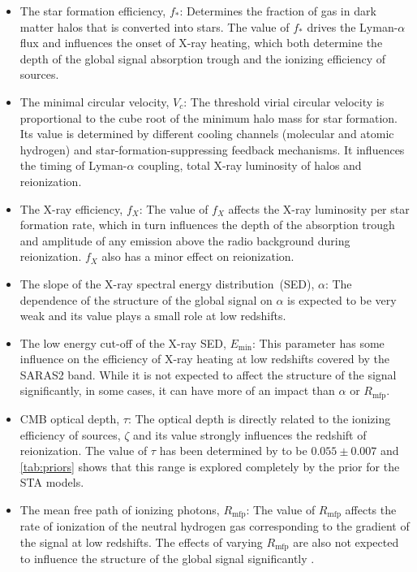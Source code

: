 \begin{itemize}
    \item The star formation efficiency, $f_*$: Determines the fraction of gas in dark matter halos that is converted into stars. The value of $f_*$ drives the Lyman-$\alpha$ flux and influences the onset of X-ray heating, which both determine the depth of the global signal absorption trough and the ionizing efficiency of sources.
    \item The minimal circular velocity, $V_c$: The threshold virial circular velocity is proportional to the cube root of the minimum halo mass for star formation. Its value is determined by different
    cooling channels (molecular and atomic hydrogen) and star-formation-suppressing feedback mechanisms. It influences the timing of Lyman-$\alpha$ coupling, total X-ray luminosity of halos and reionization.
    \item The X-ray efficiency, $f_X$: The value of $f_X$ affects the X-ray luminosity per star formation rate, which in turn influences the depth of the absorption trough and amplitude of any emission above the radio background during reionization. $f_X$ also has a minor effect on reionization.
    \item The slope of the X-ray spectral energy distribution~(SED), $\alpha$: The dependence of the structure of the global signal on $\alpha$ is expected to be very weak \citep{Monsalve_EDGES_HB_3_2019} and its value plays a small role at low redshifts.
    \item The low energy cut-off of the X-ray SED, $E_\mathrm{min}$: This parameter has some influence on the efficiency of X-ray heating at low redshifts covered by the SARAS2 band. While it is not expected to affect the structure of the signal significantly, in some cases, it can have more of an impact than $\alpha$ or $R_\mathrm{mfp}$.
    \item CMB optical depth, $\tau$: The optical depth is directly related to the ionizing efficiency of sources, $\zeta$ and its value strongly influences the redshift of reionization. The value of $\tau$ has been determined by \cite{Planck2018} to be $0.055 \pm 0.007$ and \cref{tab:priors} shows that this range is explored completely by the prior for the STA models.
    \item The mean free path of ionizing photons, $R_\mathrm{mfp}$: The value of $R_\mathrm{mfp}$ affects the rate of ionization of the neutral hydrogen gas corresponding to the gradient of the signal at low redshifts. The effects of varying $R_\mathrm{mfp}$ are also not expected to influence the structure of the global signal significantly \citep[see e.g. ][]{Monsalve_EDGES_HB_3_2019}.
\end{itemize}

